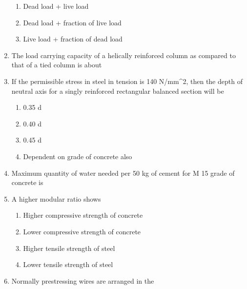 \documentclass[11pt,a4paper]{article}
\begin{document}
\begin{enumerate}
\begin{enumerate}[label=\Alph*.]
\item{Dead load + live load}
\item{Dead load + fraction of live load}
\item{Live load + fraction of dead load}
\end{enumerate}
\item{The load carrying capacity of a helically reinforced column as compared to that of a tied column is about}
\\
\item{If the permissible stress in steel in tension is 140 N/mm\^{}2, then the depth of neutral axis for a singly reinforced rectangular balanced section will be
}
\begin{enumerate}[label=\Alph*.]
\item{0.35 d}
\item{0.40 d}
\item{0.45 d}
\item{Dependent on grade of concrete also}
\end{enumerate}
\item{Maximum quantity of water needed per 50 kg of cement for M 15 grade of concrete is}
\\
\item{A higher modular ratio shows}
\begin{enumerate}[label=\Alph*.]
\item{Higher compressive strength of concrete}
\item{Lower compressive strength of concrete}
\item{Higher tensile strength of steel}
\item{Lower tensile strength of steel}
\end{enumerate}
\item{Normally prestressing wires are arranged in the}

\end{enumerate}
\end{document}
